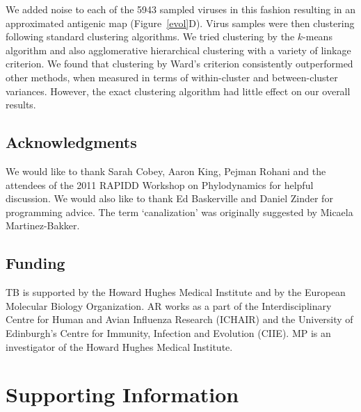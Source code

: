 \documentclass[11pt,oneside,letterpaper]{article}
\begin{document}
We added noise to each of the 5943 sampled viruses in this fashion resulting in an approximated antigenic map (Figure~\ref{evol}D).  Virus samples were then clustering following standard clustering algorithms.  We tried clustering by the $k$-means algorithm and also agglomerative hierarchical clustering with a variety of linkage criterion.  We found that clustering by Ward's criterion consistently outperformed other methods, when measured in terms of within-cluster and between-cluster variances.  However, the exact clustering algorithm had little effect on our overall results.

\subsection*{Acknowledgments} 
We would like to thank Sarah Cobey, Aaron King, Pejman Rohani and the attendees of the 2011 RAPIDD Workshop on Phylodynamics for helpful discussion.  We would also like to thank Ed Baskerville and Daniel Zinder for programming advice.  The term `canalization' was originally suggested by Micaela Martinez-Bakker. 

\subsection*{Funding} 
TB is supported by the Howard Hughes Medical Institute and by the European Molecular Biology Organization.  AR works as a part of the Interdisciplinary Centre for Human and Avian Influenza Research (ICHAIR) and the University of Edinburgh's Centre for Immunity, Infection and Evolution (CIIE).  MP is an investigator of the Howard Hughes Medical Institute.  




\pagebreak

\setcounter{figure}{0}
\setcounter{table}{0}
\setcounter{page}{1}
\renewcommand{\thefigure}{S\arabic{figure}}
\renewcommand{\thetable}{S\arabic{table}}
\renewcommand{\thepage}{S\arabic{page}}
  
\section*{Supporting Information}
\end{document}
